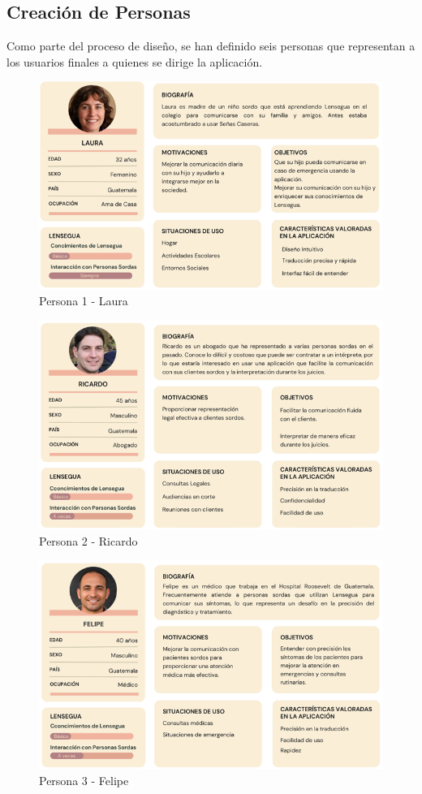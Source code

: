 \subsection{Creación de Personas}

Como parte del proceso de diseño, se han definido seis personas que representan a los usuarios finales a quienes se dirige la aplicación. 

\begin{figure} [H]
    \centering
    \includegraphics[width=0.8\linewidth]{figuras/persona_laura.png}
    \caption{Persona 1 - Laura}
    \label{fig:enter-label}
\end{figure}

\begin{figure} [H]
    \centering
    \includegraphics[width=0.8\linewidth]{figuras/ricardo_persona.png}
    \caption{Persona 2 - Ricardo}
    \label{fig:enter-label}
\end{figure}

\begin{figure} [H]
    \centering
    \includegraphics[width=0.8\linewidth]{figuras/felipe_persona.png}
    \caption{Persona 3 - Felipe}
    \label{fig:enter-label}
\end{figure}

